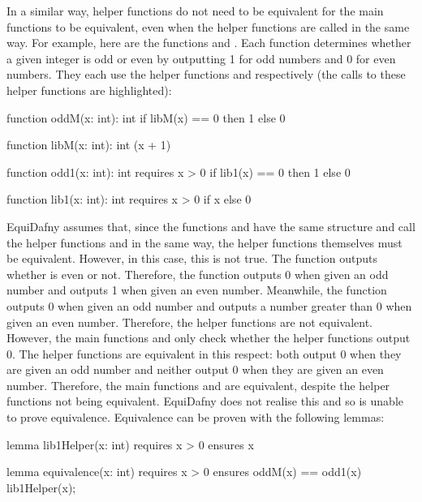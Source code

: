 In a similar way, helper functions do not need to be equivalent for the main functions to be equivalent, even when the helper functions are called in the same way. For example, here are the functions  and . Each function determines whether a given integer is odd or even by outputting 1 for odd numbers and 0 for even numbers. They each use the helper functions  and  respectively (the calls to these helper functions are highlighted):
\begin{dafny}[highlightlines={3,15}]
function oddM(x: int): int 
{
  if libM(x) == 0 then 1 
  else 0
}

function libM(x: int): int
{
  (x + 1) %
}

function odd1(x: int): int 
  requires x > 0
{
  if lib1(x) == 0 then 1 
  else 0
}

function lib1(x: int): int
  requires x > 0
{
  if x %
  else 0
}
\end{dafny}
%
EquiDafny assumes that, since the functions  and  have the same structure and call the helper functions  and  in the same way, the helper functions themselves must be equivalent. However, in this case, this is not true. The  function outputs whether  is even or not. Therefore, the function outputs 0 when given an odd number and outputs 1 when given an even number. Meanwhile, the  function outputs 0 when given an odd number and outputs a number greater than 0 when given an even number. Therefore, the helper functions are not equivalent. However, the main functions  and  only check whether the helper functions output 0. The helper functions are equivalent in this respect: both output 0 when they are given an odd number and neither output 0 when they are given an even number. Therefore, the main functions  and  are equivalent, despite the helper functions not being equivalent. EquiDafny does not realise this and so is unable to prove equivalence. Equivalence can be proven with the following lemmas:
\begin{dafny}
lemma lib1Helper(x: int)
  requires x > 0
  ensures x %
{}

lemma equivalence(x: int)
  requires x > 0
  ensures oddM(x) == odd1(x)
{
  lib1Helper(x);
}
\end{dafny}

